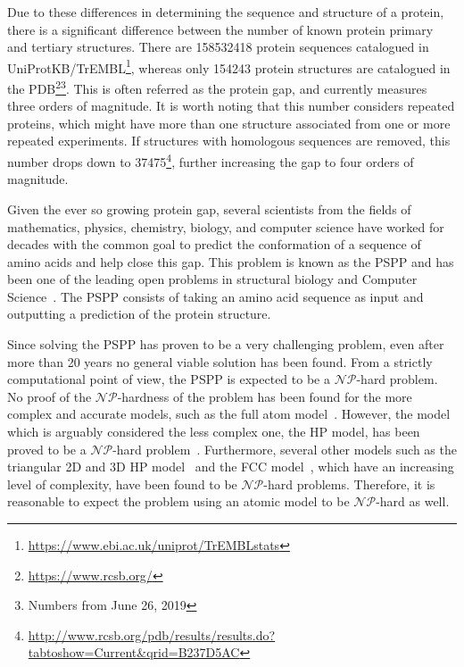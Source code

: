 Due to these differences in determining the sequence and structure of a
protein, there is a significant difference between the number of known protein
primary and tertiary structures. There are \num{158532418} protein sequences 
catalogued in UniProtKB/TrEMBL\footnote{\url{https://www.ebi.ac.uk/uniprot/TrEMBLstats}},
whereas only \num{154243} protein structures are catalogued in
the \ac{PDB}\footnote{\url{https://www.rcsb.org/}}\footnote{Numbers from June 26, 2019}.
This is often referred as the protein gap, and currently measures three orders of magnitude.
It is worth noting that this number considers repeated proteins, which might have
more than one structure associated from one or more repeated experiments. If
structures with homologous sequences are removed, this number drops down to
\num{37475}\footnote{\url{http://www.rcsb.org/pdb/results/results.do?tabtoshow=Current&qrid=B237D5AC}},
further increasing the gap to four orders of magnitude.

Given the ever so growing protein gap, several scientists from the fields of
mathematics, physics, chemistry, biology, and computer science have worked for
decades with the common goal to predict the conformation of a sequence
of amino acids and help close this gap. This problem is known as the
\acf{PSPP} and has been one of the leading open problems
in structural biology and Computer Science~\cite{dorn2014three}. The \ac{PSPP} consists of
taking an amino acid sequence as input and outputting a prediction of the protein structure.

Since solving the \ac{PSPP} has proven to be a very challenging problem, even
after more than 20 years no general viable solution has been found. From a
strictly computational point of view, the \ac{PSPP} is expected to be a
$\mathcal{NP}$-hard problem. No proof of the $\mathcal{NP}$-hardness of the
problem has been found for the more complex and accurate models, such as the
full atom model~\cite{rohl2004protein}. However, the model which is arguably
considered the less complex one, the \ac{HP} model, has been proved to be a
$\mathcal{NP}$-hard problem~\cite{berger1998protein}. Furthermore, several
other models such as the triangular 2D and 3D \ac{HP}
model~\cite{agarwala1997local} and the \ac{FCC} model~\cite{hoque2007protein},
which have an increasing level of complexity, have been found to be
$\mathcal{NP}$-hard problems.  Therefore, it is reasonable to expect the
problem using an atomic model to be $\mathcal{NP}$-hard as well.

